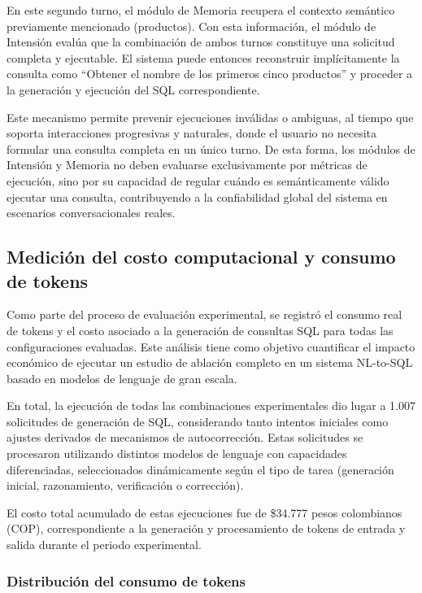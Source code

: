 \documentclass[journal]{IEEEtran}
\begin{document}
En este segundo turno, el módulo de Memoria recupera el contexto semántico previamente mencionado (productos). Con esta información, el módulo de Intensión evalúa que la combinación de ambos turnos constituye una solicitud completa y ejecutable. El sistema puede entonces reconstruir implícitamente la consulta como ``Obtener el nombre de los primeros cinco productos'' y proceder a la generación y ejecución del SQL correspondiente.

Este mecanismo permite prevenir ejecuciones inválidas o ambiguas, al tiempo que soporta interacciones progresivas y naturales, donde el usuario no necesita formular una consulta completa en un único turno. De esta forma, los módulos de Intensión y Memoria no deben evaluarse exclusivamente por métricas de ejecución, sino por su capacidad de regular cuándo es semánticamente válido ejecutar una consulta, contribuyendo a la confiabilidad global del sistema en escenarios conversacionales reales.

\subsection{Medición del costo computacional y consumo de tokens}

Como parte del proceso de evaluación experimental, se registró el consumo real de tokens y el costo asociado a la generación de consultas SQL para todas las configuraciones evaluadas. Este análisis tiene como objetivo cuantificar el impacto económico de ejecutar un estudio de ablación completo en un sistema NL-to-SQL basado en modelos de lenguaje de gran escala.

En total, la ejecución de todas las combinaciones experimentales dio lugar a 1.007 solicitudes de generación de SQL, considerando tanto intentos iniciales como ajustes derivados de mecanismos de autocorrección. Estas solicitudes se procesaron utilizando distintos modelos de lenguaje con capacidades diferenciadas, seleccionados dinámicamente según el tipo de tarea (generación inicial, razonamiento, verificación o corrección).

El costo total acumulado de estas ejecuciones fue de \$34.777 pesos colombianos (COP), correspondiente a la generación y procesamiento de tokens de entrada y salida durante el periodo experimental.

\subsubsection{Distribución del consumo de tokens}
\end{document}
